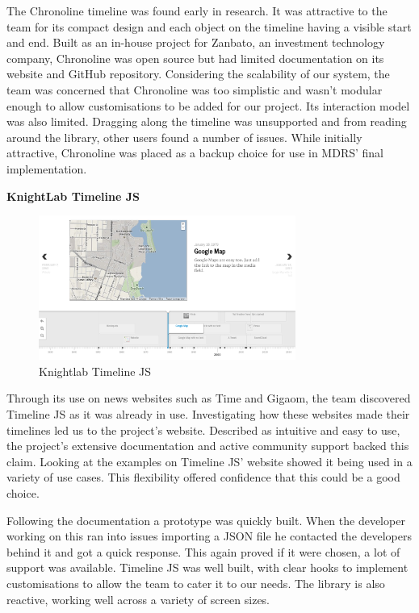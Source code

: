 \documentclass{l3proj}
\begin{document}
The Chronoline timeline was found early in research. It was attractive to the team for its compact design and each object on the timeline having a visible start and end. Built as an in-house project for Zanbato, an investment technology company, Chronoline was open source but had limited documentation on its website and GitHub repository. Considering the scalability of our system, the team was concerned that Chronoline was too simplistic and wasn't modular enough to allow customisations to be added for our project. Its interaction model was also limited. Dragging along the timeline was unsupported and from reading around the library, other users found a number of issues. While initially attractive, Chronoline was placed as a backup choice for use in MDRS' final implementation.

\textbf{KnightLab Timeline JS}
\begin{figure}[ht!]
  \centering
\includegraphics[width=0.75\textwidth]{images/timeline-example.png}
\caption{Knightlab Timeline JS}
\end{figure}

Through its use on news websites such as Time and Gigaom, the team discovered Timeline JS as it was already in use. Investigating how these websites made their timelines led us to the project's website. Described as intuitive and easy to use, the project's extensive documentation and active community support backed this claim. Looking at the examples on Timeline JS' website showed it being used in a variety of use cases. This flexibility offered confidence that this could be a good choice.

Following the documentation a prototype was quickly built. When the developer working on this ran into issues importing a JSON file he contacted the developers behind it and got a quick response. This again proved if it were chosen, a lot of support was available. Timeline JS was well built, with clear hooks to implement customisations to allow the team to cater it to our needs. The library is also reactive, working well across a variety of screen sizes.
\end{document}
